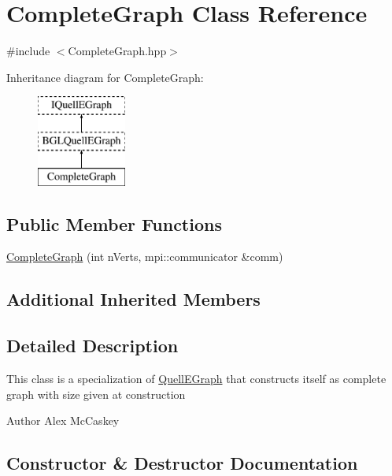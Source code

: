 \hypertarget{a00035}{}\section{Complete\+Graph Class Reference}
\label{a00035}


{\ttfamily \#include $<$Complete\+Graph.\+hpp$>$}

Inheritance diagram for Complete\+Graph\+:\begin{figure}[H]
\begin{center}
\leavevmode
\includegraphics[height=3.000000cm]{a00035}
\end{center}
\end{figure}
\subsection*{Public Member Functions}
\begin{DoxyCompactItemize}
\item 
\hyperlink{a00035_ac1643761c88b85059e332a68c557fb43}{Complete\+Graph} (int n\+Verts, mpi\+::communicator \&comm)
\end{DoxyCompactItemize}
\subsection*{Additional Inherited Members}


\subsection{Detailed Description}
This class is a specialization of \hyperlink{a00100}{Quell\+E\+Graph} that constructs itself as complete graph with size given at construction

\begin{DoxyAuthor}{Author}
Alex Mc\+Caskey 
\end{DoxyAuthor}


\subsection{Constructor \& Destructor Documentation}
